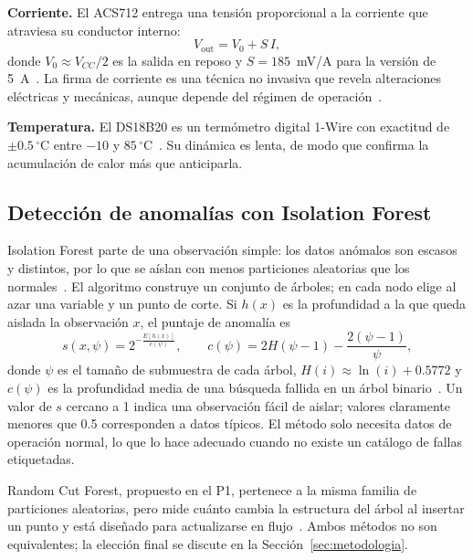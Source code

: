 \documentclass[10pt,twocolumn]{article}
\begin{document}
\textbf{Corriente.} El ACS712 entrega una tensión proporcional a la corriente que atraviesa su
conductor interno:
\begin{equation}
  V_{\mathrm{out}} = V_0 + S\,I ,
  \label{eq:acs}
\end{equation}
donde $V_0\approx V_{CC}/2$ es la salida en reposo y $S=185$~mV/A para la versión de
5~A~\cite{acs712}. La firma de corriente es una técnica no invasiva que revela alteraciones
eléctricas y mecánicas, aunque depende del régimen de operación~\cite{niu2023,benbouzid2000}.

\textbf{Temperatura.} El DS18B20 es un termómetro digital 1-Wire con exactitud de
$\pm0.5\,^{\circ}$C entre $-10$ y $85\,^{\circ}$C~\cite{ds18b20}. Su dinámica es lenta, de modo
que confirma la acumulación de calor más que anticiparla.

\subsection{Detección de anomalías con Isolation Forest}
Isolation Forest parte de una observación simple: los datos anómalos son escasos y distintos, por
lo que se aíslan con menos particiones aleatorias que los normales~\cite{liu2008,liu2012}. El
algoritmo construye un conjunto de árboles; en cada nodo elige al azar una variable y un punto de
corte. Si $h(x)$ es la profundidad a la que queda aislada la observación $x$, el puntaje de
anomalía es
\begin{equation}
  s(x,\psi) = 2^{-\frac{E[h(x)]}{c(\psi)}}, \qquad
  c(\psi) = 2H(\psi-1) - \frac{2(\psi-1)}{\psi},
  \label{eq:iforest}
\end{equation}
donde $\psi$ es el tamaño de submuestra de cada árbol, $H(i)\approx\ln(i)+0.5772$ y $c(\psi)$ es
la profundidad media de una búsqueda fallida en un árbol binario~\cite{liu2008}. Un valor de $s$
cercano a 1 indica una observación fácil de aislar; valores claramente menores que 0.5 corresponden
a datos típicos. El método solo necesita datos de operación normal, lo que lo hace adecuado cuando
no existe un catálogo de fallas etiquetadas.

Random Cut Forest, propuesto en el P1, pertenece a la misma familia de particiones aleatorias,
pero mide cuánto cambia la estructura del árbol al insertar un punto y está diseñado para
actualizarse en flujo~\cite{guha2016}. Ambos métodos no son equivalentes; la elección final se
discute en la Sección~\ref{sec:metodologia}.
\end{document}
